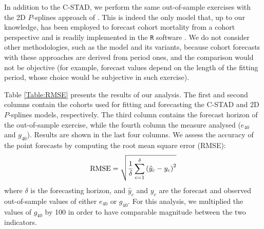 \documentclass[11pt, a4paper]{article}
\begin{document}
In addition to the C-STAD, we perform the same out-of-sample exercises with the 2D $P$-splines approach of \cite{currie2004smoothing}. This is indeed the only model that, up to our knowledge, has been employed to forecast cohort mortality from a cohort perspective \citep{cmi2007stochastic} and is readily implemented in the \texttt{R} software \cite[in the \texttt{MortalitySmooth} package,][]{camarda2012mortalitysmooth}. We do not consider other methodologies, such as the \cite{lee1992modeling} model and its variants, because cohort forecasts with these approaches are derived from period ones, and the comparison would not be objective (for example, forecast values depend on the length of the fitting period, whose choice would be subjective in such exercise).  

Table \ref{Table:RMSE} presents the results of our analysis. The first and second columns contain the cohorts used for fitting and forecasting the C-STAD and 2D $P$-splines models, respectively. The third column contains the forecast horizon of the out-of-sample exercise, while the fourth column the measure analysed ($e_{40}$ and $g_{40}$). Results are shown in the last four columns. We assess the accuracy of the point forecasts by computing the root mean square error (RMSE):
%
\begin{equation}\label{Eq:RMSE}
\mathrm{RMSE}=\sqrt{\frac{1}{\delta} \sum_{c=1}^{\delta} \left(\hat{y}_c-y_c\right)^2} \notag
\end{equation} 
%
where $\delta$ is the forecasting horizon, and $\hat{y}_c$ and $y_c$ are the forecast and observed out-of-sample values of either $e_{40}$ or $g_{40}$. For this analysis, we multiplied the values of $g_{40}$ by 100 in order to have comparable magnitude between the two indicators. \par 
\end{document}
